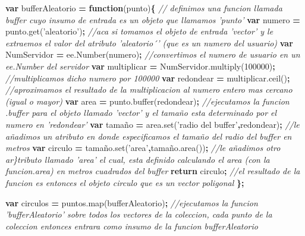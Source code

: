 \documentclass[
]{article}
\newenvironment{Shaded}{\begin{snugshade}}{\end{snugshade}}
\newcommand{\AttributeTok}[1]{\textcolor[rgb]{0.77,0.63,0.00}{#1}}
\newcommand{\CommentTok}[1]{\textcolor[rgb]{0.56,0.35,0.01}{\textit{#1}}}
\newcommand{\ControlFlowTok}[1]{\textcolor[rgb]{0.13,0.29,0.53}{\textbf{#1}}}
\newcommand{\DecValTok}[1]{\textcolor[rgb]{0.00,0.00,0.81}{#1}}
\newcommand{\KeywordTok}[1]{\textcolor[rgb]{0.13,0.29,0.53}{\textbf{#1}}}
\newcommand{\NormalTok}[1]{#1}
\newcommand{\OperatorTok}[1]{\textcolor[rgb]{0.81,0.36,0.00}{\textbf{#1}}}
\newcommand{\StringTok}[1]{\textcolor[rgb]{0.31,0.60,0.02}{#1}}
\newcommand{\VariableTok}[1]{\textcolor[rgb]{0.00,0.00,0.00}{#1}}
\begin{document}
\begin{Shaded}
\begin{Highlighting}[]
\KeywordTok{var}\NormalTok{ bufferAleatorio }\OperatorTok{=} \KeywordTok{function}\NormalTok{(punto)}\OperatorTok{\{}   \CommentTok{// definimos una funcion llamada buffer cuyo insumo de entrada es un objeto que llamamos 'punto'}
  \KeywordTok{var}\NormalTok{ numero }\OperatorTok{=} \VariableTok{punto}\NormalTok{.}\AttributeTok{get}\NormalTok{(}\StringTok{'aleatorio'}\NormalTok{)}\OperatorTok{;} \CommentTok{//aca si tomamos el objeto de entrada 'vector' y le extraemos el valor del atributo 'aleatorio´' (que es un numero del usuario)}
  \KeywordTok{var}\NormalTok{ NumServidor }\OperatorTok{=} \VariableTok{ee}\NormalTok{.}\AttributeTok{Number}\NormalTok{(numero)}\OperatorTok{;} \CommentTok{//convertimos el numero de usuario en un ee.Number del servidor}
  \KeywordTok{var}\NormalTok{ multiplicar }\OperatorTok{=} \VariableTok{NumServidor}\NormalTok{.}\AttributeTok{multiply}\NormalTok{(}\DecValTok{100000}\NormalTok{)}\OperatorTok{;} \CommentTok{//multiplicamos dicho numero por 100000}
  \KeywordTok{var}\NormalTok{ redondear }\OperatorTok{=} \VariableTok{multiplicar}\NormalTok{.}\AttributeTok{ceil}\NormalTok{()}\OperatorTok{;} \CommentTok{//aproximamos el resultado de la multiplicacion al numero entero mas cercano (igual o mayor)}
  \KeywordTok{var}\NormalTok{ area }\OperatorTok{=} \VariableTok{punto}\NormalTok{.}\AttributeTok{buffer}\NormalTok{(redondear)}\OperatorTok{;} \CommentTok{//ejecutamos la funcion .buffer para el objeto llamado 'vector' y el tamaño esta determinado por el numero en 'redondear'}
  \KeywordTok{var}\NormalTok{ tamaño }\OperatorTok{=} \VariableTok{area}\NormalTok{.}\AttributeTok{set}\NormalTok{(}\StringTok{'radio del buffer'}\OperatorTok{,}\NormalTok{redondear)}\OperatorTok{;} \CommentTok{//le añadimos un atributo en donde especificamos el tamaño del radio del buffer en metros}
  \KeywordTok{var}\NormalTok{ circulo }\OperatorTok{=} \VariableTok{tamaño}\NormalTok{.}\AttributeTok{set}\NormalTok{(}\StringTok{'area'}\OperatorTok{,}\VariableTok{tamaño}\NormalTok{.}\AttributeTok{area}\NormalTok{())}\OperatorTok{;} \CommentTok{//le añadimos otro ar\}tributo llamado 'area' el cual, esta definido calculando el area (con la funcion.area) en metros cuadrados del buffer }
  \ControlFlowTok{return}\NormalTok{ circulo}\OperatorTok{;} \CommentTok{//el resultado de la funcion es entonces el objeto circulo que es un vector poligonal}
\OperatorTok{\};}

\KeywordTok{var}\NormalTok{ circulos }\OperatorTok{=} \VariableTok{puntos}\NormalTok{.}\AttributeTok{map}\NormalTok{(bufferAleatorio)}\OperatorTok{;} \CommentTok{//ejecutamos la funcion 'bufferAleatorio' sobre todos los vectores de la coleccion, cada punto de la coleccion entonces entrara como insumo de la funcion bufferAleatorio}
\end{Highlighting}
\end{Shaded}
\end{document}
